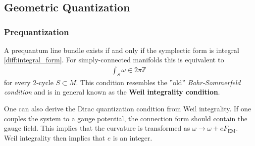 \chapter{}

\section{Geometric Quantization}\label{section:geometric_quantization}
\subsection{Prequantization}

    \begin{property}
        A prequantum line bundle exists if and only if the symplectic form is integral \ref{diff:integral_form}. For simply-connected manifolds this is equivalent to
        \begin{gather}
            \int_S\omega \in 2\pi\mathbb{Z}
        \end{gather}
        for every 2-cycle $S\subset M$. This condition resembles the ''old'' \textit{Bohr-Sommerfeld condition} and is in general known as the \textbf{Weil integrality condition}.
    \end{property}
    \begin{result}
        One can also derive the Dirac quantization condition from Weil integrality. If one couples the system to a gauge potential, the connection form should contain the gauge field. This implies that the curvature is transformed as $\omega\longrightarrow\omega + eF_{\text{EM}}$. Weil integrality then implies that $e$ is an integer.
    \end{result}



